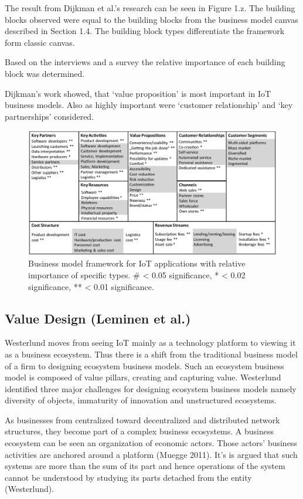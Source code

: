 		The result from Dijkman et al.'s research can be seen in Figure 1.z. The building blocks observed were equal to the building blocks from the business model canvas described in Section 1.4. The building block types differentiate the framework form classic canvas.

		Based on the interviews and a survey the relative importance of each building block was determined. 

		Dijkman's work showed, that `value proposition' is most important in IoT business models. Also as highly important were `customer relationship' and `key  partnerships' considered. 
		\begin{figure}[h]
			\begin{center}
		    \includegraphics[scale=0.52]{Talk11/iot_canvas_rel_imp_dijkman.jpg}
		    \end{center}
		    \caption{Business model framework for IoT applications with relative importance of specific types. \# < 0.05 significance, * < 0.02 significance, **  < 0.01 significance.}
		    \label{Business model for IoT}
		\end{figure}

		\subsection{Value Design (Leminen et al.)}
		Westerlund moves from seeing IoT mainly as a technology platform to viewing it as a business ecosystem. Thus there is a shift from the traditional business model of a firm to designing ecosystem business models. Such an ecosystem business model is composed of value pillars, creating and capturing value. Westerlund identified three major challenges for designing ecosystem business models namely diversity of objects, immaturity of innovation and unstructured ecosystems.

		As businesses from centralized toward decentralized and distributed network structures, they become part of a complex business ecosystems. A business ecosystem can be seen an organization of economic actors. Those actors' business activities are anchored around a platform (Muegge 2011). It's is argued that such systems are more than the sum of its part and hence operations of the system cannot be understood by studying its parts detached from the entity (Westerlund).

